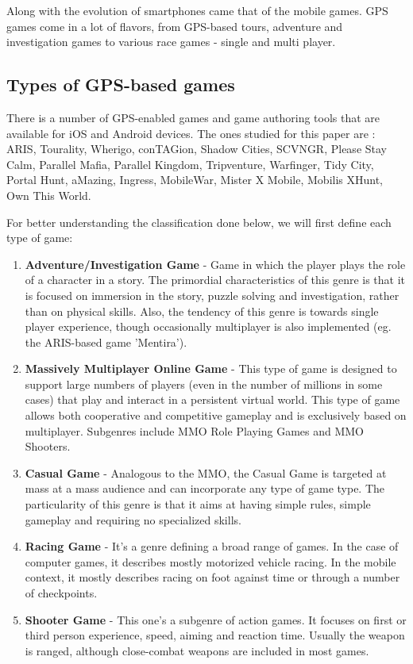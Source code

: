 \documentclass{article}
\begin{document}
Along with the evolution of smartphones came that of the mobile games. GPS games
come in a lot of flavors, from GPS-based tours, adventure and investigation
games to various race games - single and multi player.


\subsection{Types of GPS-based games }

There is a number of GPS-enabled games and game authoring tools that are
available for iOS and Android devices. The ones studied for this paper are :
ARIS, Tourality, Wherigo, conTAGion, Shadow Cities, SCVNGR, Please
Stay Calm, Parallel Mafia, Parallel Kingdom, Tripventure, Warfinger, Tidy City,
Portal Hunt, aMazing, Ingress, MobileWar, Mister X Mobile, Mobilis XHunt, Own
This World.\newline

For better understanding the classification done below, we will first define
each type of game:

\begin{enumerate}
  \item \textbf{Adventure/Investigation Game} - Game in which the player plays
  the role of a character in a story. The primordial characteristics of this
  genre is that it is focused on immersion in the story, puzzle solving and
  investigation, rather than on physical skills. Also, the tendency of this
  genre is towards single player experience, though occasionally multiplayer is
  also implemented (eg. the ARIS-based game 'Mentira').
  
  \item \textbf{Massively Multiplayer Online Game} - This type of game is
  designed to support large numbers of players (even in the number of millions
  in some cases) that play and interact in a persistent virtual world. This type
  of game allows both cooperative and competitive gameplay and is exclusively
  based on multiplayer. Subgenres include MMO Role Playing Games and MMO
  Shooters.
  
  \item \textbf{Casual Game} - Analogous to the MMO, the Casual Game is targeted
  at mass at a mass audience and can incorporate any type of game type. The
  particularity of this genre is that it aims at having simple rules, simple
  gameplay and requiring no specialized skills. 
  
  \item \textbf{Racing Game} - It's a genre defining a broad range of games. In
  the case of computer games, it describes mostly motorized vehicle racing. In
  the mobile context, it mostly describes racing on foot against time or through
  a number of checkpoints.
  
  \item \textbf{Shooter Game} - This one's a subgenre of action games. It
  focuses on first or third person experience, speed, aiming and reaction time.
  Usually the weapon is ranged, although close-combat weapons are included in
  most games.
  
\end{enumerate}
\end{document}

